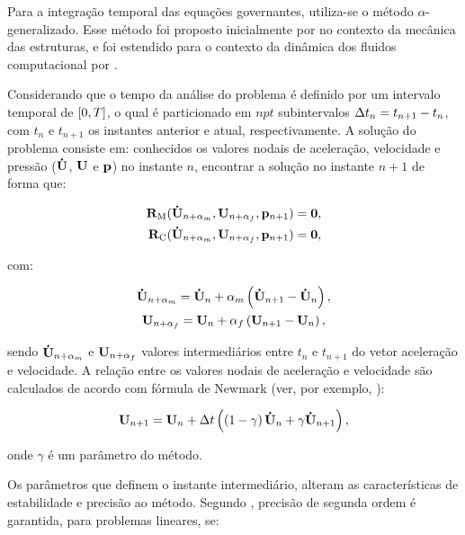 Para a integração temporal das equações governantes, utiliza-se o método $\alpha$-generalizado. Esse método foi proposto inicialmente por  no contexto da mecânica das estruturas, e foi estendido para o contexto da dinâmica dos fluidos computacional por .

Considerando que o tempo da análise do problema é definido por um intervalo temporal de $[0,T]$, o qual é particionado em $npt$ subintervalos $\Delta t_{n} = t_{n+1} - t_{n}$, com $t_{n}$ e $t_{n+1}$ os instantes anterior e atual, respectivamente. A solução do problema consiste em: conhecidos os valores nodais de aceleração, velocidade e pressão ($\mathbf{\dot{U}}$, $\mathbf{U}$ e $\mathbf{p}$) no instante $n$, encontrar a solução no instante $n+1$ de forma que:

\begin{align}
\mathbf{R}_\mathrm{M}(\mathbf{\dot{U}}_{n+\alpha_m},\mathbf{U}_{n+\alpha_f},\mathbf{p}_{n+1}) = \mathbf{0}, \label{eq:resid_QM_alpha}\\
\mathbf{R}_\mathrm{C}(\mathbf{\dot{U}}_{n+\alpha_m},\mathbf{U}_{n+\alpha_f},\mathbf{p}_{n+1}) = \mathbf{0}, \label{eq:resid_cont_alpha}
\end{align}

\noindent com:

\begin{gather}
\mathbf{\dot{U}}_{n+\alpha_m} = \mathbf{\dot{U}}_n + \alpha_m \left( \mathbf{\dot{U}}_{n+1} - \mathbf{\dot{U}}_n \right), \label{eq:inter_acel}\\
\mathbf{U}_{n+\alpha_f} = \mathbf{U}_n + \alpha_f \left( \mathbf{U}_{n+1} - \mathbf{U}_n \right), \label{eq:inter_vel}
\end{gather}

\noindent sendo $\mathbf{\dot{U}}_{n+\alpha_m}$ e $\mathbf{U}_{n+\alpha_f}$ valores intermediários entre $t_{n}$ e $t_{n+1}$ do vetor aceleração e velocidade. A relação entre os valores nodais de aceleração e velocidade são calculados de acordo com fórmula de Newmark (ver, por exemplo, \cite{Hughes:1976}):

\begin{gather}
\mathbf{U}_{n+1} = \mathbf{U}_n + \Delta t\left(\left(1-\gamma\right)\mathbf{\dot{U}}_n + \gamma\mathbf{\dot{U}}_{n+1} \right), \label{eq:Newmark}
\end{gather}

\noindent onde $\gamma$ é um parâmetro do método.

Os parâmetros que definem o instante intermediário, alteram as características de estabilidade e precisão ao método. Segundo , precisão de segunda ordem é garantida, para problemas lineares, se: 

